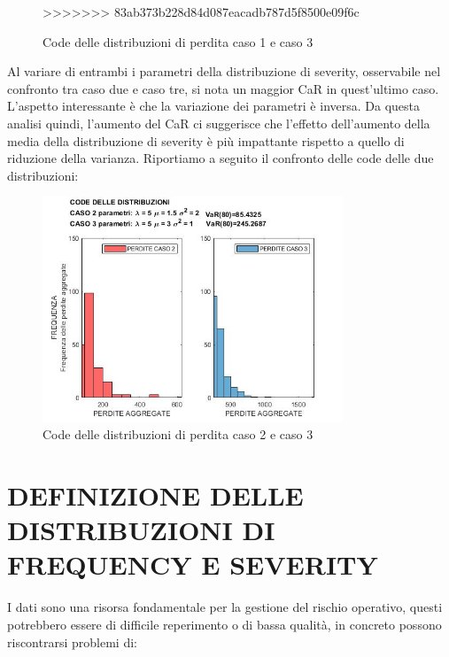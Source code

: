 \documentclass[titlepage]{article}
\begin{document}
\begin{itemize}
\begin{figure}[htbp]
>>>>>>> 83ab373b228d84d087eacadb787d5f8500e09f6c
	\caption{\label{fig:CODE 1VS3.jpg}Code delle distribuzioni di perdita caso 1 e caso 3}
\end{figure}

		Al variare di entrambi i parametri della distribuzione di severity, osservabile nel confronto tra caso due e caso tre, si nota un maggior CaR in quest’ultimo caso. L’aspetto interessante è che la variazione dei parametri è inversa. Da questa analisi quindi, l’aumento del CaR ci suggerisce che l’effetto dell’aumento della media della distribuzione di severity è più impattante rispetto a quello di riduzione della varianza. Riportiamo a seguito il confronto delle code delle due distribuzioni:
\begin{figure}[htbp]
	\centering
	\includegraphics[width=0.8\textwidth]{CODE2VS3.jpg}
	\caption{\label{fig:CODE 2VS3.jpg}Code delle distribuzioni di perdita caso 2 e caso 3}
\end{figure}
\newpage
\section{DEFINIZIONE DELLE DISTRIBUZIONI DI FREQUENCY E SEVERITY}
 I dati sono una risorsa fondamentale per la gestione del rischio operativo, questi potrebbero essere di difficile reperimento o di bassa qualità, in concreto possono riscontrarsi problemi di:
 \begin{itemize}
 	


\end{itemize}
\end{itemize}
\end{document}

